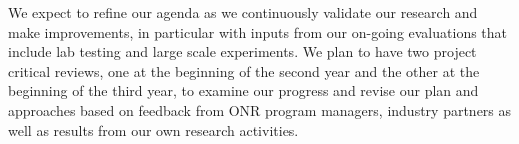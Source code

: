 We expect to refine our agenda as we continuously validate our research and make
improvements, in particular with inputs from our on-going evaluations that
include lab testing and large scale experiments. We plan to have two project
critical reviews, one at the beginning of the second year and the other at the
beginning of the third year, to examine our progress and revise our plan and
approaches based on feedback from ONR program managers, industry partners as
well as results from our own research activities.
